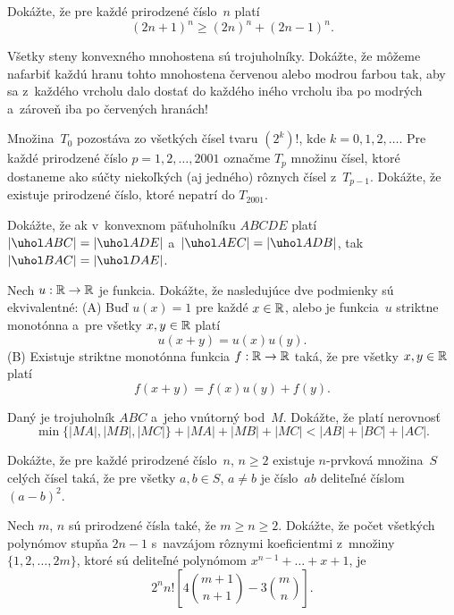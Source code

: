 {%
Dokážte, že pre každé prirodzené číslo~$n$ platí
$$
  (2n + 1)^n \ge (2n)^n + (2n - 1)^n.
$$}

{%
Všetky steny konvexného mnohostena sú trojuholníky. Dokážte, že môžeme
nafarbiť každú hranu tohto mnohostena červenou alebo modrou farbou
tak, aby sa z~každého vrcholu dalo dostať do každého iného vrcholu iba
po modrých a~zároveň iba po červených hranách!}

{%
Množina~$T_0$ pozostáva zo všetkých čísel tvaru $(2^k)!$, kde $k = 0, 1,
2, \dots$. Pre každé prirodzené číslo $p = 1, 2, \dots , 2001$ označme
$T_p$ množinu čísel, ktoré dostaneme ako súčty niekoľkých (aj jedného)
rôznych čísel z~$T_{p - 1}$. Dokážte, že existuje prirodzené číslo,
ktoré nepatrí do $T_{2001}$.}

{%
Dokážte, že ak v~konvexnom päťuholníku $ABCDE$ platí $|\uhol ABC| =
|\uhol ADE|$ a~$|\uhol AEC| = |\uhol ADB|$, tak $|\uhol BAC| = |\uhol
DAE|$.}

{%
Nech $u:\Bbb R\to\Bbb R$ je funkcia. Dokážte, že nasledujúce dve podmienky
sú ekvivalentné:
\ite (A)
Buď $u(x)=1$ pre každé $x\in\Bbb R$, alebo je funkcia~$u$ striktne
monotónna a~pre všetky $x,y\in\Bbb R$ platí
$$
  u(x+y) = u(x) u(y).
$$
\ite (B)
Existuje striktne monotónna funkcia $f:\Bbb R\to\Bbb R$ taká, že
pre všetky $x,y\in\Bbb R$ platí
$$
  f(x+y) = f(x) u(y) + f(y).
$$}

{%
Daný je trojuholník $ABC$ a~jeho vnútorný bod~$M$. Dokážte, že platí
nerovnosť
$$
 \min{\{ |MA|, |MB|, |MC| \}} + |MA| + |MB| + |MC|
  < |AB| + |BC| + |AC|.
$$}

{%
Dokážte, že pre každé prirodzené číslo~$n$, $n\ge 2$ existuje $n$-prvková
množina~$S$ celých čísel taká, že pre všetky $a,b\in S$, $a\ne b$ je číslo~$ab$
deliteľné číslom $(a-b)^2$.}

{%
Nech $m$, $n$ sú prirodzené čísla také, že $m\ge n\ge 2$. Dokážte, že počet
všetkých polynómov stupňa $2n-1$ s~navzájom rôznymi koeficientmi z~množiny
$\{1,2,\dots,2m\}$, ktoré sú deliteľné polynómom
$ x^{n-1} +\dots+ x + 1 $,  je
$$
  2^n n! \left[ 4 \binom{m+1}{n+1} - 3 \binom{m}{n} \right].
$$}


